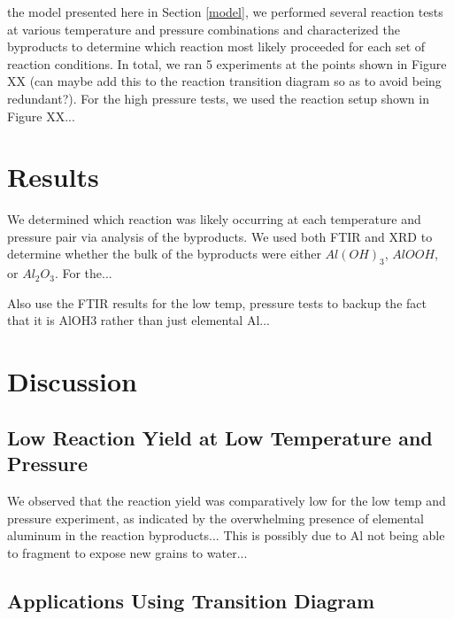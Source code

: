 \documentclass[preprint,12pt,3p]{elsarticle}
\begin{document}
the model presented here in Section \ref{model}, we performed
several reaction tests at various temperature and pressure combinations and
characterized the byproducts to determine which reaction most likely proceeded
for each set of reaction conditions. In total, we ran 5 experiments at the
points shown in Figure XX (can maybe add this to the reaction transition diagram
so as to avoid being redundant?). For the high pressure tests, we used the
reaction setup shown in Figure XX...


\section{Results}
\label{results}

We determined which reaction was likely occurring at each temperature and
pressure pair via analysis of the byproducts. We used both FTIR and XRD to
determine whether the bulk of the byproducts were either $Al(OH)_3$, $AlOOH$, or
$Al_2O_3$. For the...

Also use the FTIR results for the low temp, pressure tests to backup the fact
that it is AlOH3 rather than just elemental Al...

\section{Discussion}
\label{discussion}

\subsection{Low Reaction Yield at Low Temperature and Pressure}

We observed that the reaction yield was comparatively low for the low temp and
pressure experiment, as indicated by the overwhelming presence of elemental
aluminum in the reaction byproducts... This is possibly due to Al not being able
to fragment to expose new grains to water...
 
\subsection{Applications Using Transition Diagram}
\end{document}
